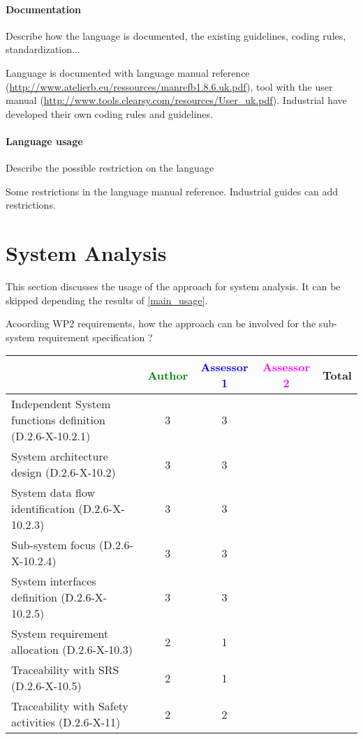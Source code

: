 \paragraph{Documentation} Describe how the language is documented, the existing guidelines, coding rules, standardization...

\begin{author_comment}

Language is documented with language manual reference (\url{http://www.atelierb.eu/ressources/manrefb1.8.6.uk.pdf}), tool with the user manual (\url{http://www.tools.clearsy.com/resources/User_uk.pdf}). Industrial have developed their own coding rules and guidelines.
\end{author_comment}


\paragraph{Language usage} Describe the possible restriction on the language
\begin{author_comment}
Some restrictions in the language manual reference. Industrial guides can add restrictions.
\end{author_comment}

\section{System Analysis}
This section discusses the usage of the approach for system analysis.
It can be skipped depending the results of \ref{main_usage}.

Acoording WP2 requirements, how the approach can be involved for the sub-system requirement specification ?

\begin{tabular}{|l | c | c | c | c|}
\hline
& \textcolor{green}{Author} & \textcolor{blue}{Assessor 1} & \textcolor{magenta}{Assessor 2} & Total \\
\hline
Independent System functions definition (D.2.6-X-10.2.1)  & 3 & 3 & &  \\
\hline 
System architecture design (D.2.6-X-10.2) & 3 & 3 & &  \\
\hline
System data flow identification (D.2.6-X-10.2.3)  & 3 & 3 & &  \\
\hline
Sub-system focus (D.2.6-X-10.2.4)  & 3 & 3 & &  \\
\hline
System interfaces definition (D.2.6-X-10.2.5)  & 3 & 3 & &  \\
\hline
System requirement allocation (D.2.6-X-10.3)  & 2 & 1 & &  \\
\hline
Traceability with SRS (D.2.6-X-10.5)  & 2 & 1 & &  \\
\hline
Traceability with Safety activities (D.2.6-X-11)  & 2 & 2 & &  \\
\hline
\end{tabular}

